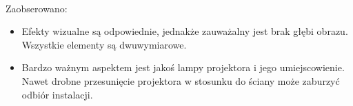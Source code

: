 \paragraph{}
Zaobserowano:
\begin{itemize}
	\item Efekty wizualne są odpowiednie, jednakże zauważalny jest brak głębi obrazu. Wszystkie elementy są dwuwymiarowe.
	\item Bardzo ważnym aspektem jest jakoś lampy projektora i jego umiejscowienie. Nawet drobne przesunięcie projektora w stosunku do ściany może zaburzyć odbiór instalacji.
\end{itemize}

